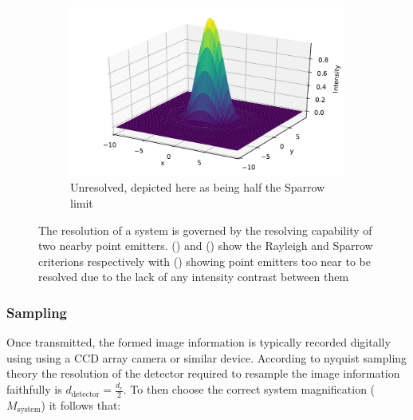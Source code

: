     \begin{figure}
    \ContinuedFloat
    \begin{subfigure}[b]{\textwidth}
        \includegraphics{+airy_too_close}
        \caption{Unresolved, depicted here as being half the Sparrow limit}
        \label{fig:airy_too_close}
    \end{subfigure}
    \caption{The resolution of a system is governed by the resolving capability of two nearby point emitters.
    () and () show the Rayleigh and Sparrow criterions respectively with () showing point emitters too near to be resolved due to the lack of any intensity contrast between them}
    \label{fig:airy_disk_resolution}
\end{figure}

%

\subsubsection{Sampling}


Once transmitted, the formed image information is typically recorded digitally using using a \gls{CCD} array camera or similar device.
According to \Gls{nyquist sampling theory} the resolution of the detector required to resample the image information faithfully is $d_\text{detector} = \frac{d_r}{2}$.
To then choose the correct system magnification ($M_\text{system}$) it follows that:

